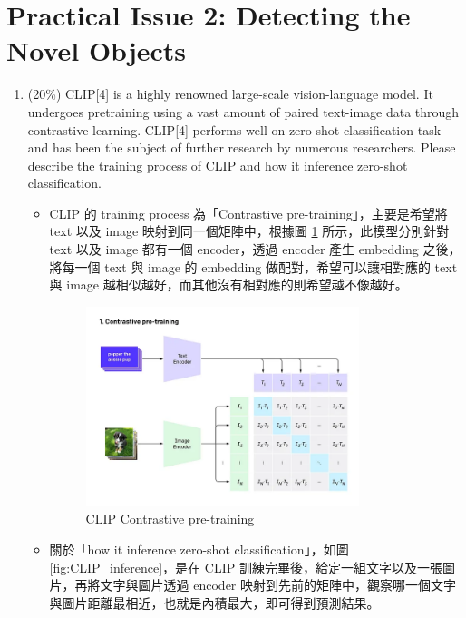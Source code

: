 \documentclass[10pt,a4paper]{article}
\begin{document}
\section*{Practical Issue 2: Detecting the Novel Objects}
\begin{enumerate}
\item (20\%) CLIP[4] is a highly renowned large-scale vision-language model. It undergoes pretraining using a vast amount of paired text-image data through contrastive learning. CLIP[4] performs well on zero-shot classification task and has been the subject of further research by numerous researchers. Please describe the training process of CLIP and how it inference zero-shot classification.
\begin{itemize}
\item CLIP 的 training process 為「Contrastive pre-training」，主要是希望將 text 以及 image 映射到同一個矩陣中，根據圖 \ref{fig:Contrastive_pre_training} 所示，此模型分別針對 text 以及 image 都有一個 encoder，透過 encoder 產生 embedding 之後，將每一個 text 與 image 的 embedding 做配對，希望可以讓相對應的 text 與 image 越相似越好，而其他沒有相對應的則希望越不像越好。

\begin{figure}[hbt]
\centering
\includegraphics[width=0.8\textwidth]{contrastive_pre_training.png}
\caption{CLIP Contrastive pre-training}
\label{fig:Contrastive_pre_training}
\end{figure}


\item 關於「how it inference zero-shot classification」，如圖 \ref{fig:CLIP_inference}，是在 CLIP 訓練完畢後，給定一組文字以及一張圖片，再將文字與圖片透過 encoder 映射到先前的矩陣中，觀察哪一個文字與圖片距離最相近，也就是內積最大，即可得到預測結果。
\end{itemize}


\end{enumerate}
\end{document}
